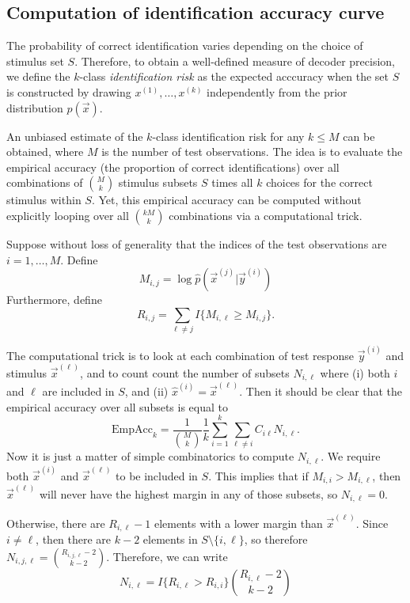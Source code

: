 \documentclass[12pt]{article}
\begin{document}
\subsection{Computation of identification accuracy curve}

The probability of correct identification varies depending on the choice of stimulus set $S$.  Therefore, to obtain a well-defined measure of decoder precision, we define the $k$-class \emph{identification risk} as the expected acccuracy when the set $S$ is constructed by drawing $x^{(1)},\hdots, x^{(k)}$ independently from the prior distribution $p(\vec{x})$.  

An unbiased estimate of the $k$-class identification risk for any $k \leq M$ can be obtained, where $M$ is the number of test observations.  The idea is to evaluate the empirical accuracy (the proportion of correct identifications) over all combinations of ${M}\choose{k}$ stimulus subsets $S$ times all $k$ choices for the correct stimulus within $S$.  Yet, this empirical accuracy can be computed without explicitly looping over all $k{M}\choose{k}$ combinations via a computational trick.

Suppose without loss of generality that the indices of the test observations are $i = 1,\hdots, M$.
Define
\[
M_{i,j} = \log \hat{p}(\vec{x}^{(j)}|\vec{y}^{(i)})
\]
Furthermore, define
\[
R_{i,j} = \sum_{\ell \neq j} I\{M_{i,\ell} \geq M_{i, j}\}.
\]

The computational trick is to look at each combination of test
response $\vec{y}^{(i)}$ and stimulus $\vec{x}^{(\ell)}$, and to count
count the number of subsets $N_{i, \ell}$ where (i) both $i$ and
$\ell$ are included in $S$, and (ii) $\hat{x}^{(i)} = \vec{x}^{(\ell)}$.
Then it should be clear that the empirical accuracy over all subsets is
equal to
\begin{equation}\label{eq:avtestrisk}
\text{EmpAcc}_k = \frac{1}{{{M}\choose{k}}}\frac{1}{k} \sum_{i=1}^{k} \sum_{\ell\neq i} C_{i\ell}N_{i, \ell}.
\end{equation}
Now it is just a matter of simple combinatorics to compute
$N_{i,\ell}$.  We require both $\vec{x}^{(i)}$ and $\vec{x}^{(\ell)}$ to be
included in $S$.  This implies that if $M_{i,i} > M_{i,\ell}$,
then $\vec{x}^{(\ell)}$ will never have the highest margin in any of those
subsets, so $N_{i,\ell} = 0$.

Otherwise, there are $R_{i,\ell} - 1$ elements
with a lower margin than $\vec{x}^{(\ell)}$.  Since $i \neq \ell$, then there
are $k-2$ elements in $S \setminus \{i, \ell\}$, so therefore $N_{i,
j, \ell} = {{R_{i,j,\ell} - 2}\choose{k - 2}}$.  Therefore, we can write
\begin{equation}\label{eq:avtestrisk_nil}
N_{i,\ell} = I\{R_{i,\ell} > R_{i,i}\}{{R_{i,\ell} -2}\choose{k - 2}}
\end{equation}
\end{document}
